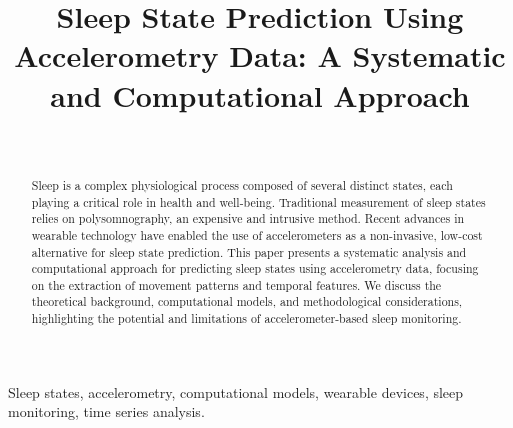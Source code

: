 \documentclass[conference]{IEEEtran}
\begin{document}
\title{Sleep State Prediction Using Accelerometry Data: A Systematic and Computational Approach}

\author{
	\\
	\and
}

\maketitle

\begin{abstract}
	Sleep is a complex physiological process composed of several distinct states, each playing a critical role in health and well-being. Traditional measurement of sleep states relies on polysomnography, an expensive and intrusive method. Recent advances in wearable technology have enabled the use of accelerometers as a non-invasive, low-cost alternative for sleep state prediction. This paper presents a systematic analysis and computational approach for predicting sleep states using accelerometry data, focusing on the extraction of movement patterns and temporal features. We discuss the theoretical background, computational models, and methodological considerations, highlighting the potential and limitations of accelerometer-based sleep monitoring.
\end{abstract}

\begin{IEEEkeywords}
	Sleep states, accelerometry, computational models, wearable devices, sleep monitoring, time series analysis.
\end{IEEEkeywords}
\end{document}
